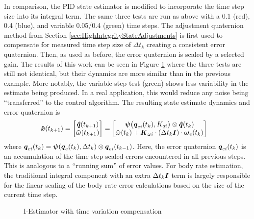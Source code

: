 In comparison, the PID state estimator is modified to incorporate the time step size into its integral term.  The same three tests are run as above with a 0.1 (red), 0.4 (blue), and variable 0.05/0.4 (green) time steps.  The adjustment quaternion method from Section \ref{sec:HighIntegrityStateAdjustments} is first used to compensate for measured time step size of $\Delta t_{k}$ creating a consistent error quaternion.  Then, as used as before, the error quaternion is scaled by a selected gain.  The results of this work can be seen in Figure \ref{fig:IEstimatorwithtimevariationcompensation} where the three tests are still not identical, but their dynamics are more similar than in the previous example.  More notably, the variable step test (green) shows less variability in the estimate being produced.  In a real application, this would reduce any noise being ``transferred'' to the control algorithm.  The resulting state estimate dynamics and error quaternion is
\begin{equation}
  \begin{aligned}
    \boldsymbol{\hat{x}}(t_{k+1}) &= \begin{bmatrix} \boldsymbol{\hat{q}}(t_{k+1}) \\ \boldsymbol{\hat{\omega}}(t_{k+1}) \end{bmatrix} =
    \begin{bmatrix} \boldsymbol{\psi}\big(\boldsymbol{q}_{ei}(t_k), K_{qi}\big) \otimes \boldsymbol{\hat{q}}(t_{k}) \\
     \boldsymbol{\hat{\omega}}(t_{k}) + \boldsymbol{K}_{\omega i} \cdot (\Delta t_k \boldsymbol{I})\cdot \boldsymbol{\omega}_e(t_{k}) \end{bmatrix}
  \end{aligned}
  \label{eqn:IEstimator}
\end{equation}
where $\boldsymbol{q}_{ei}(t_k) = \boldsymbol{\psi}(\boldsymbol{q}_e(t_{k}), \Delta t_{k}) \otimes \boldsymbol{q}_{ei}(t_{k-1})$.  Here, the error quaternion $\boldsymbol{q}_{ei}(t_k)$ is an accumulation of the time step scaled errors encountered in all previous steps.  This is analogous to a ``running sum'' of error values.  For body rate estimation, the traditional integral component with an extra $\Delta t_k \boldsymbol{I}$ term is largely responsible for the linear scaling of the body rate error calculations based on the size of the current time step.

\begin{figure}[H]
  \centerline{}
  \caption{I-Estimator with time variation compensation}
  \label{fig:IEstimatorwithtimevariationcompensation}
\end{figure}

